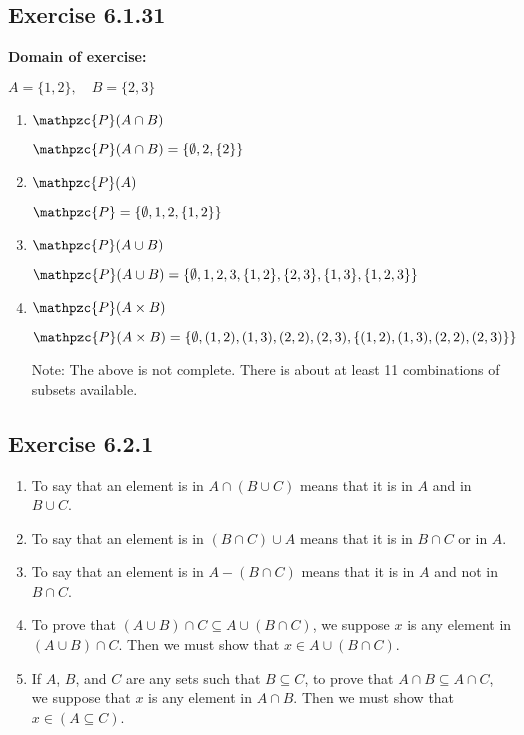 \documentclass{report}
\newcommand{\cent}[1]{\begin{center}#1\end{center}}
\newcommand{\In}{\! \in \!}
\newcommand{\script}[1]{\mathpzc{#1}}
\newcommand{\Domain}{\textbf{Domain of exercise: }}
\newcommand{\Exercise}[1]{\subsection{Exercise #1}}
\newcommand{\defaultEnumerateLabel}{\textbf{\alph*.}}
\begin{document}
		\Exercise{6.1.31}
		
		\Domain
		
		\cent{$A = \{1,2\}, \quad B = \{2,3\}$}
		
		\begin{enumerate}[label = \defaultEnumerateLabel]
			\item $\script{P}(A \cap B)$
			
			\cent{$\script{P}(A \cap B) = \{\emptyset,2,\{2\}\}$}
			
			\item $\script{P}(A)$
			
			\cent{$\script{P} = \{\emptyset,1,2,\{1,2\}\}$}
			
			\item $\script{P}(A \cup B)$
			
			\cent{$\script{P}(A \cup B) = \{\emptyset,1,2,3,\{1,2\},\{2,3\},\{1,3\},\{1,2,3\}\}$}
			
			\item $\script{P}(A \times B)$
			
			\cent{$\script{P}(A \times B) = \{\emptyset,(1,2),(1,3),(2,2),(2,3),\{(1,2),(1,3),(2,2),(2,3)\}\}$}
			
			Note: The above is not complete. There is about at least 11 combinations of subsets available.
		\end{enumerate}
	
	\Exercise{6.2.1}
	
	\begin{enumerate}[label=\defaultEnumerateLabel]
		\item To say that an element is in $A \cap (B \cup C)$ means that it is in $A$ and in $B \cup C$.
		
		\item To say that an element is in $(B \cap C) \cup A$ means that it is in $B \cap C$ or in $A$.
		
		\item To say that an element is in $A - (B \cap C)$ means that it is in $A$ and not in $B\cap C$.
		
		\item To prove  that $(A \cup B) \cap C \subseteq A \cup (B \cap C )$, we suppose $x$ is any element in $(A \cup B) \cap C$. Then we must show that $x \In A \cup (B \cap C )$.
		
		\item If $A$, $B$, and $C$  are any sets such that $B \subseteq C$, to prove that $A \cap B \subseteq A \cap C$, we suppose that $x$ is any element in $A \cap B$. Then we must show  that $x \In (A \subseteq C)$.
	\end{enumerate}
	
\end{document}

